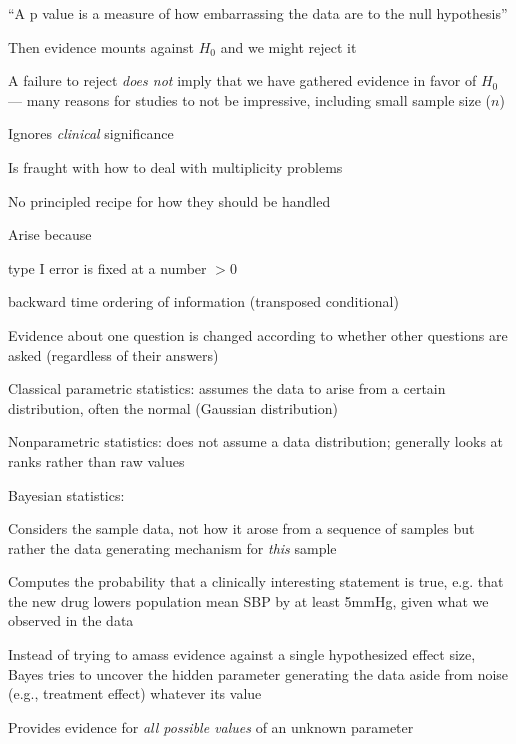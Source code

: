    ``A p value is a measure of how embarrassing the data are to the null
   hypothesis''
 \item Then evidence mounts against $H_{0}$ and we might reject it
 \item A failure to reject \emph{does not} imply that we have gathered
   evidence in favor of $H_0$ --- many reasons for studies to not
   be impressive, including small sample size ($n$)
 \item Ignores \emph{clinical} significance
 \item Is fraught with how to deal with multiplicity problems
   \bi
   \item No principled recipe for how they should be handled
   \item Arise because
     \bi
     \item type I error is fixed at a number $> 0$
     \item backward time ordering of information (transposed conditional)
     \ei
   \item Evidence about one question is changed according to whether
     other questions are asked (regardless of their answers)
   \ei
 \ei
\item Classical parametric statistics: assumes the data to arise from
  a certain distribution, often the normal (Gaussian distribution)
\item Nonparametric statistics: does not assume a data distribution;
  generally looks at ranks rather than raw values
\item Bayesian statistics: 
 \bi
 \item Considers the sample data, not how it arose from a sequence of
   samples but rather the data generating mechanism for \emph{this} sample
 \item Computes the probability that a clinically interesting
   statement is true, e.g. that the new drug lowers population mean
   SBP by at least 5mmHg, given what we observed in the data
 \item Instead of trying to amass evidence against a single
   hypothesized effect size, Bayes tries to uncover the hidden
   parameter generating the data aside from noise (e.g., treatment
   effect) whatever its value
   \bi
    \item Provides evidence for \emph{all possible values} of an unknown parameter
   \ei

